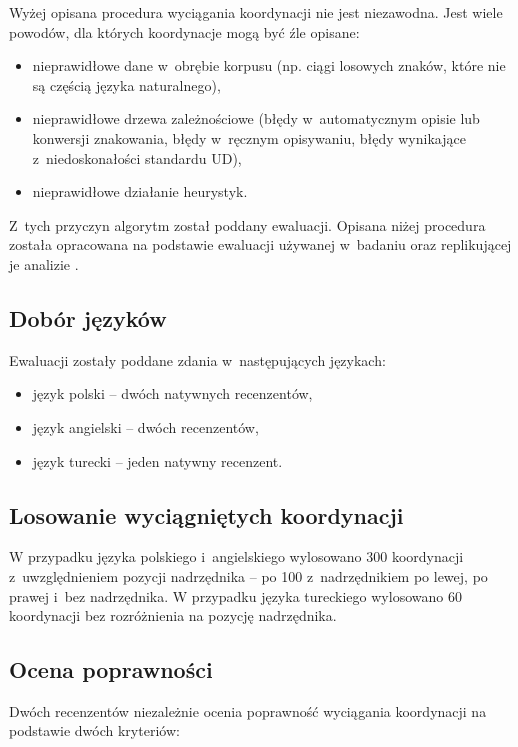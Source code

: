 Wyżej opisana procedura wyciągania koordynacji nie jest niezawodna. Jest wiele powodów, dla których koordynacje mogą być źle opisane:

\begin{itemize}
\item nieprawidłowe dane w~obrębie korpusu (np. ciągi losowych znaków, które nie są częścią języka naturalnego),
\item nieprawidłowe drzewa zależnościowe (błędy w~automatycznym opisie lub konwersji znakowania, błędy w~ręcznym opisywaniu, błędy wynikające z~niedoskonałości standardu UD),
\item nieprawidłowe działanie heurystyk.
\end{itemize}

Z~tych przyczyn algorytm został poddany ewaluacji. Opisana niżej procedura została opracowana na podstawie ewaluacji używanej w~badaniu \cite{przepiorkowski2023conjunct} oraz replikującej je analizie \cite{przepiorkowski2024argument}.

\subsection{Dobór języków}

Ewaluacji zostały poddane zdania w~następujących językach:

\begin{itemize}
\item język polski -- dwóch natywnych recenzentów,
\item język angielski -- dwóch recenzentów,
\item język turecki -- jeden natywny recenzent.
\end{itemize}

\subsection{Losowanie wyciągniętych koordynacji}

W przypadku języka polskiego i~angielskiego wylosowano 300 koordynacji z~uwzględnieniem pozycji nadrzędnika -- po 100 z~nadrzędnikiem po lewej, po prawej i~bez nadrzędnika. W przypadku języka tureckiego wylosowano 60 koordynacji bez rozróżnienia na pozycję nadrzędnika.

\subsection{Ocena poprawności}

Dwóch recenzentów niezależnie ocenia poprawność wyciągania koordynacji na podstawie dwóch kryteriów:

